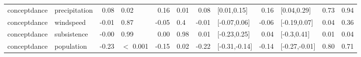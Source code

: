 \begin{table}[ht]
\begin{tabular}{llrlrlrlrlrr}
  conceptdance & precipitation & 0.08 & 0.02 & 0.16 & 0.01 & 0.08 & [0.01,0.15] & 0.16 & [0.04,0.29] & 0.73 & 0.94 \\ 
  conceptdance & windspeed & -0.01 & 0.87 & -0.05 & 0.4 & -0.01 & [-0.07,0.06] & -0.06 & [-0.19,0.07] & 0.04 & 0.36 \\ 
  conceptdance & subsistence & -0.00 & 0.99 & 0.00 & 0.98 & 0.01 & [-0.23,0.25] & 0.04 & [-0.3,0.41] & 0.01 & 0.04 \\ 
  conceptdance & population & -0.23 & $<$ 0.001 & -0.15 & 0.02 & -0.22 & [-0.31,-0.14] & -0.14 & [-0.27,-0.01] & 0.80 & 0.71 \\ 
   \hline
\end{tabular}
\end{table}

